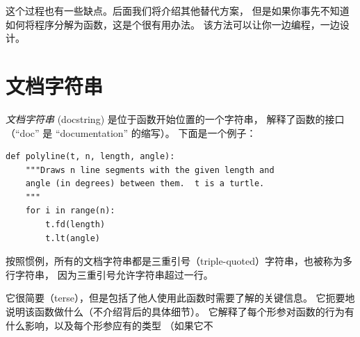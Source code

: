 
这个过程也有一些缺点。后面我们将介绍其他替代方案，
但是如果你事先不知道如何将程序分解为函数，这是个很有用办法。
该方法可以让你一边编程，一边设计。

\section{文档字符串}
\label{docstring}


\emph{文档字符串} (docstring) 是位于函数开始位置的一个字符串，
解释了函数的接口（``doc'' 是 ``documentation'' 的缩写）。 下面是一个例子：

\begin{lstlisting}
def polyline(t, n, length, angle):
    """Draws n line segments with the given length and
    angle (in degrees) between them.  t is a turtle.
    """
    for i in range(n):
        t.fd(length)
        t.lt(angle)
\end{lstlisting}


按照惯例，所有的文档字符串都是三重引号（triple-quoted）字符串，也被称为多行字符串，
因为三重引号允许字符串超过一行。
  
  


它很简要（terse），但是包括了他人使用此函数时需要了解的关键信息。
它扼要地说明该函数做什么（不介绍背后的具体细节）。
它解释了每个形参对函数的行为有什么影响，以及每个形参应有的类型
（如果它不


